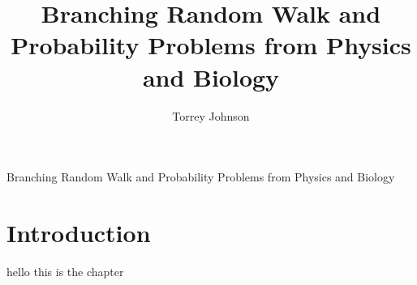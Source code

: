 \documentclass[double,12pt]{beavtex}
\title{Branching Random Walk and Probability Problems
from Physics and Biology}
\author{Torrey Johnson}
\begin{document}
\maketitle

\mainmatter

\begingroup
\let\clearpage\relax
\begin{center}
\large
Branching Random Walk and Probability Problems
from Physics and Biology
\normalsize
\end{center}
\chapter{Introduction}
hello this is the chapter
%
\endgroup


% 

% 

% 

% 

% 
% 

% 
\end{document}
